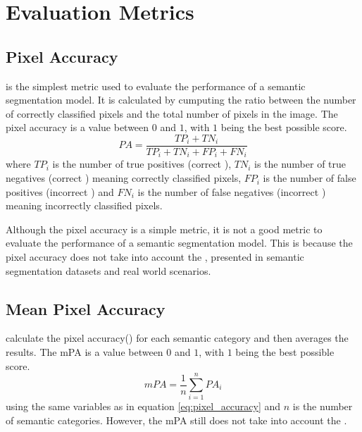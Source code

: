 \section{Evaluation Metrics}

  \subsection{Pixel Accuracy}

     is the simplest metric used to evaluate the performance
    of a semantic segmentation model. It is calculated by cumputing the ratio
    between the number of correctly classified pixels and the total number of
    pixels in the image\cite{long2015fully}. The pixel accuracy is a value between
    $0$ and $1$, with $1$ being the best possible score.
    \begin{equation}
      \label{eq:pixel_accuracy}
      PA = \frac{TP_i + TN_i}{TP_i + TN_i + FP_i + FN_i}
    \end{equation}
    where $TP_i$ is the number of true positives (correct ),
    $TN_i$ is the number of true negatives (correct )
    meaning correctly classified pixels, $FP_i$ is the number of false positives
    (incorrect ) and $FN_i$ is the number of false negatives
    (incorrect ) meaning incorrectly classified pixels.

    Although the pixel accuracy is a simple metric, it is not a good metric to
    evaluate the performance of a semantic segmentation model. This is because
    the pixel accuracy does not take into account the ,
    presented in semantic segmentation datasets and real world scenarios.
    
  \subsection{Mean Pixel Accuracy}

     calculate the pixel accuracy() for each
    semantic category and then averages the results\cite{long2015fully}. The mPA is a value between $0$ and $1$,
    with $1$ being the best possible score.
    \begin{equation}
      \label{eq:mean_pixel_accuracy}
      mPA = \frac{1}{n} \sum_{i=1}^{n} PA_i
    \end{equation}
    using the same variables as in equation \ref{eq:pixel_accuracy} and $n$ is the
    number of semantic categories. However, the mPA still does not take into account
    the .


